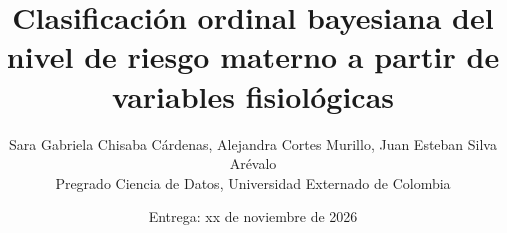 \documentclass[10pt,twocolumn]{article}
\title{Clasificación ordinal bayesiana del nivel de riesgo materno a partir de variables fisiológicas}
\author{Sara Gabriela Chisaba Cárdenas, Alejandra Cortes Murillo, Juan Esteban Silva Arévalo\\
Pregrado Ciencia de Datos, Universidad Externado de Colombia}
\date{Entrega: xx de noviembre de 2026}
\begin{document}
\maketitle


\onecolumn
\appendix
\end{document}
